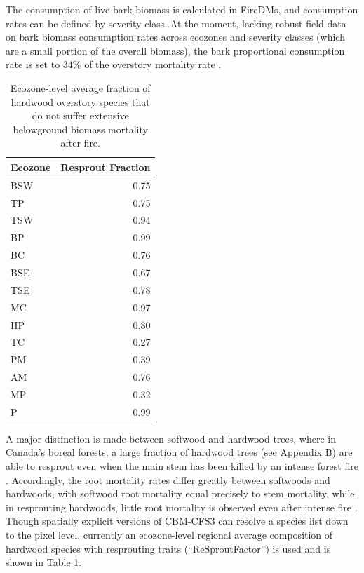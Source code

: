 \documentclass[, manuscript]{copernicus}
\begin{document}
The consumption of live bark biomass is calculated in FireDMs, and
consumption rates can be defined by severity class. At the moment,
lacking robust field data on bark biomass consumption rates across
ecozones and severity classes (which are a small portion of the overall
biomass), the bark proportional consumption rate is set to 34\% of the
overstory mortality rate \citep{santín2015}.

\begin{table}
\centering
\caption{\label{tab:tab-ReSproutByEcozone}Ecozone-level average fraction of hardwood overstory species that do not suffer extensive belowground biomass mortality after fire.}
\centering
\begin{tabular}[t]{l|r}
\hline
Ecozone & Resprout Fraction\\
\hline
BSW & 0.75\\
\hline
TP & 0.75\\
\hline
TSW & 0.94\\
\hline
BP & 0.99\\
\hline
BC & 0.76\\
\hline
BSE & 0.67\\
\hline
TSE & 0.78\\
\hline
MC & 0.97\\
\hline
HP & 0.80\\
\hline
TC & 0.27\\
\hline
PM & 0.39\\
\hline
AM & 0.76\\
\hline
MP & 0.32\\
\hline
P & 0.99\\
\hline
\end{tabular}
\end{table}

A major distinction is made between softwood and hardwood trees, where
in Canada's boreal forests, a large fraction of hardwood trees (see
Appendix B) are able to resprout even when the main stem has been killed
by an intense forest fire \citep{brown1987}. Accordingly, the root
mortality rates differ greatly between softwoods and hardwoods, with
softwood root mortality equal precisely to stem mortality, while in
resprouting hardwoods, little root mortality is observed even after
intense fire \citep{pérez-izquierdo2019}. Though spatially explicit
versions of CBM-CFS3 can resolve a species list down to the pixel level,
currently an ecozone-level regional average composition of hardwood
species with resprouting traits (``ReSproutFactor'') is used and is
shown in Table \ref{tab:tab-ReSproutByEcozone}.
\end{document}
